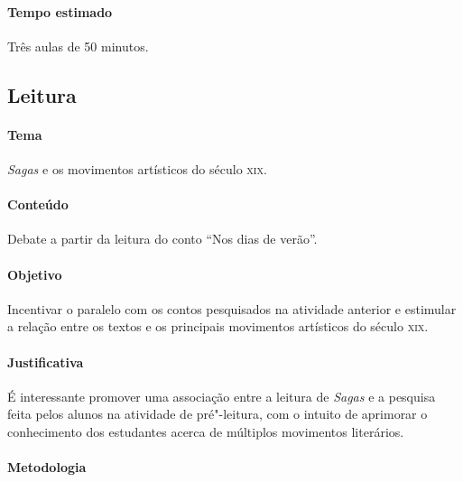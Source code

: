 \documentclass[12pt]{extarticle}
\begin{document}



\paragraph{Tempo estimado} Três aulas de 50 minutos.


\subsection{Leitura}


\paragraph{Tema} \emph{Sagas} e os movimentos artísticos do século \textsc{xix}.

\paragraph{Conteúdo} Debate a partir da leitura do conto ``Nos dias de verão''.

\paragraph{Objetivo} Incentivar o paralelo com os contos pesquisados na atividade anterior
e estimular a relação entre os textos e os principais movimentos artísticos do século \textsc{xix}.

\paragraph{Justificativa} É interessante promover uma associação entre a leitura de \emph{Sagas} 
e a pesquisa feita pelos alunos na atividade de pré"-leitura, com o intuito de aprimorar
o conhecimento dos estudantes acerca de múltiplos movimentos literários.

\paragraph{Metodologia}
\end{document}
